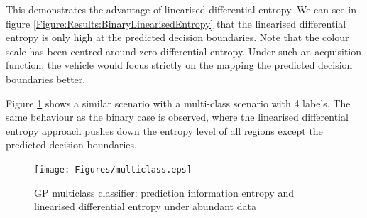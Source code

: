 \documentclass{article}
\begin{document}
%		
		
		This demonstrates the advantage of linearised differential entropy. We can see in figure \ref{Figure:Results:BinaryLinearisedEntropy} that the linearised differential entropy is only high at the predicted decision boundaries. Note that the colour scale has been centred around zero differential entropy. Under such an acquisition function, the vehicle would focus strictly on the mapping the predicted decision boundaries better.
		
		Figure \ref{Figure:Results:MulticlassLinearisedEntropy} shows a similar scenario with a multi-class scenario with 4 labels. The same behaviour as the binary case is observed, where the linearised differential entropy approach pushes down the entropy level of all regions except the predicted decision boundaries.
	
		\begin{figure}[t]
		\centering
			\texttt{[image: Figures/multiclass.eps]}
		\caption{GP multiclass classifier: prediction information entropy and linearised differential entropy under abundant data}
		\label{Figure:Results:MulticlassLinearisedEntropy}
		\end{figure}
			
		
\end{document}
